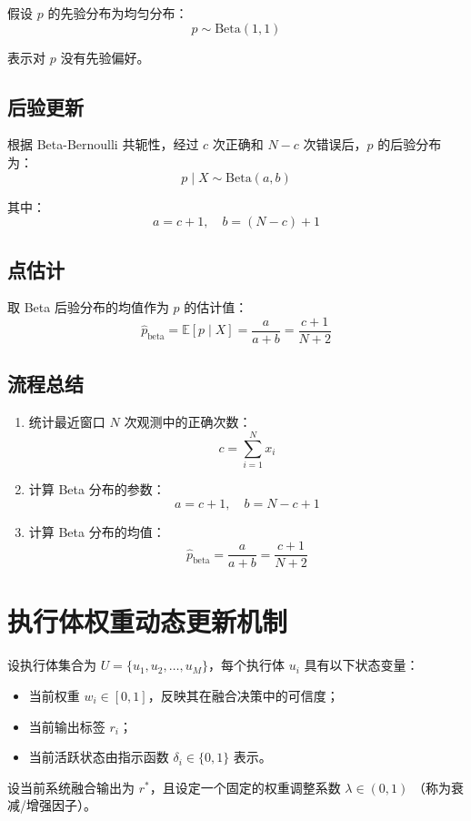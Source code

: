 \documentclass{article}
\begin{document}
假设 \( p \) 的先验分布为均匀分布：
\[
p \sim \text{Beta}(1,1)
\]

表示对 \( p \) 没有先验偏好。

\subsection*{后验更新}

根据 Beta-Bernoulli 共轭性，经过 \( c \) 次正确和 \( N-c \) 次错误后，\( p \) 的后验分布为：
\[
p \mid X \sim \text{Beta}(a,b)
\]

其中：
\[
a = c+1, \quad b = (N-c)+1
\]

\subsection*{点估计}

取 Beta 后验分布的均值作为 \( p \) 的估计值：
\[
\hat{p}_{\text{beta}} =
\mathbb{E}[p \mid X] =
\frac{a}{a+b} =
\frac{c+1}{N+2}
\]

\subsection*{流程总结}

\begin{enumerate}
    \item 统计最近窗口 \( N \) 次观测中的正确次数：
    \[
    c = \sum_{i=1}^{N} x_i
    \]
    \item 计算 Beta 分布的参数：
    \[
    a = c+1, \quad b = N-c+1
    \]
    \item 计算 Beta 分布的均值：
    \[
    \hat{p}_{\text{beta}} =
    \frac{a}{a+b} =
    \frac{c+1}{N+2}
    \]
\end{enumerate}

\section*{执行体权重动态更新机制}

设执行体集合为 \( U = \{ u_1, u_2, \dots, u_M \} \)，每个执行体 \( u_i \) 具有以下状态变量：
\begin{itemize}
  \item 当前权重 \( w_i \in [0,1] \)，反映其在融合决策中的可信度；
  \item 当前输出标签 \( r_i \)；
  \item 当前活跃状态由指示函数 \(\delta_i \in \{0,1\}\) 表示。
\end{itemize}

设当前系统融合输出为 \( r^* \)，且设定一个固定的权重调整系数 \( \lambda \in (0,1) \) （称为衰减/增强因子）。
\end{document}
